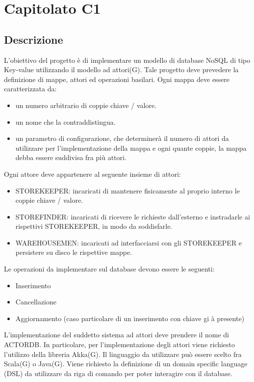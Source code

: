 \section{Capitolato C1}
\subsection{Descrizione}
L'obiettivo del progetto è di implementare un modello di database NoSQL di tipo Key‐value utilizzando il modello ad attori(G).
Tale progetto deve prevedere la definizione di mappe, attori ed operazioni basilari. 
Ogni mappa deve essere caratterizzata da:
\begin{itemize}
\item
un numero arbitrario di coppie chiave / valore. 
\item 
un nome che la contraddistingua. 
\item
un parametro di configurazione, che determinerà il numero di attori da utilizzare per l'implementazione della mappa e ogni quante coppie, la mappa debba essere suddivisa fra più attori.
\end{itemize}
Ogni attore deve appartenere al seguente insieme di attori:
\begin{itemize}
\item
STOREKEEPER: incaricati di mantenere fisicamente al proprio interno le coppie chiave / valore.
\item
STOREFINDER: incaricati di ricevere le richieste dall’esterno e instradarle ai 
rispettivi STOREKEEPER, in modo da soddisfarle. 
\item
WAREHOUSEMEN: incaricati ad interfacciarsi con gli STOREKEEPER e persistere su disco le rispettive mappe.
\end{itemize}

Le operazioni da implementare sul database devono essere le seguenti: 
\begin{itemize}
\item
Inserimento
\item
Cancellazione 
\item
Aggiornamento (caso particolare di un inserimento con chiave gi
à presente) 
\end{itemize}

L'implementazione del suddetto sistema ad attori deve prendere il nome di ACTORDB. In particolare, per l'implementazione degli attori viene richiesto l'utilizzo della libreria Akka(G).
Il linguaggio da utilizzare può essere scelto fra Scala(G) o Java(G). 
Viene richiesto la definizione di un domain specific language (DSL) da utilizzare da riga di comando per poter interagire con il database.

